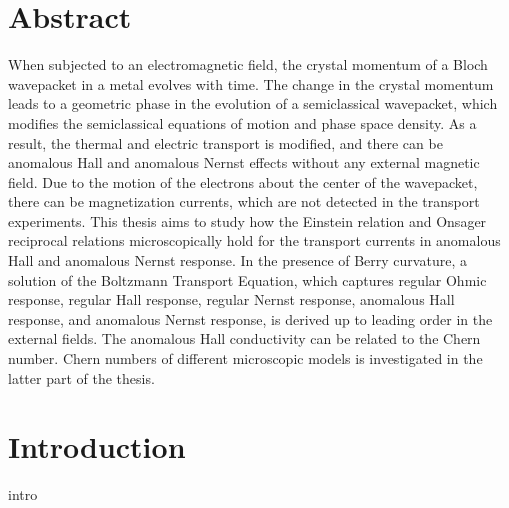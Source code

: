 \documentclass{report}
\begin{document}
\chapter*{\center Abstract}%
%
When subjected to an electromagnetic field, the crystal momentum of a Bloch wavepacket in a metal evolves with time. The change in the crystal momentum leads to a geometric phase in the evolution of a semiclassical wavepacket, which modifies the semiclassical equations of motion and phase space density. As a result, the thermal and electric transport is modified, and there can be anomalous Hall and anomalous Nernst effects without any external magnetic field. Due to the motion of the electrons about the center of the wavepacket, there can be magnetization currents, which are not detected in the transport experiments. This thesis aims to study how the Einstein relation and Onsager reciprocal relations microscopically hold for the transport currents in anomalous Hall and anomalous Nernst response. In the presence of Berry curvature, a solution of the Boltzmann Transport Equation, which captures regular Ohmic response, regular Hall response, regular Nernst response, anomalous Hall response, and anomalous Nernst response, is derived up to leading order in the external fields. The anomalous Hall conductivity can be related to the Chern number. Chern numbers of different microscopic models is investigated in the latter part of the thesis.


\tableofcontents





\chapter{Introduction}
intro
\end{document}
